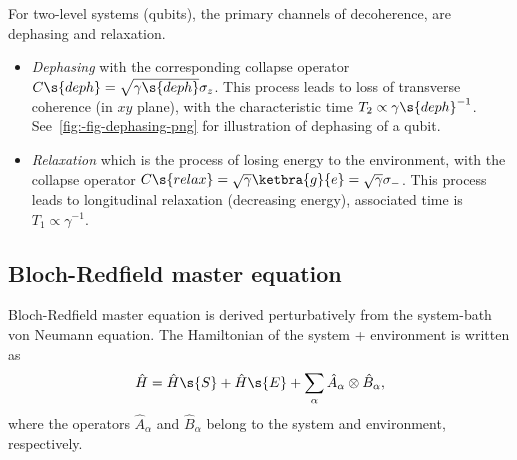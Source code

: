 \documentclass[fontsize=9pt,bookmarkpackage=false]{scrartcl}
\begin{document}
For two-level systems (qubits), the primary channels of decoherence, are dephasing and relaxation.
\begin{itemize}
  \tightlist
  \item \emph{Dephasing} with the corresponding collapse operator $C\s{deph} = \sqrt{ \gamma\s{deph} } \sigma_z$.
  This process leads to loss of transverse coherence (in $xy$ plane), with the characteristic time $T_2 \propto \gamma\s{deph} ^{-1}$.
  See~\cref{fig:-fig-dephasing-png} for illustration of dephasing of a qubit.
  \item \emph{Relaxation} which is the process of losing energy to the environment, with the collapse operator $C\s{relax} = \sqrt{ \gamma } \ketbra{ g }{ e } =\sqrt{ \gamma } \sigma_-$.
  This process leads to longitudinal relaxation (decreasing energy), associated time is $T_1 \propto \gamma ^{-1}$.
\end{itemize}



\subsection{Bloch-Redfield master equation} %
\label{sec:bloch_redfield_master_equation}

Bloch-Redfield master equation is derived perturbatively from the system-bath von Neumann equation.
The Hamiltonian of the system + environment is written as
\begin{equation}
  \hat H = \hat H\s{S} + \hat H\s{E} + \sum_\alpha \hat A_\alpha \otimes \hat B_\alpha,
\end{equation}
where the operators $\hat A_\alpha$ and $\hat B_\alpha$ belong to the system and environment, respectively.
\end{document}
